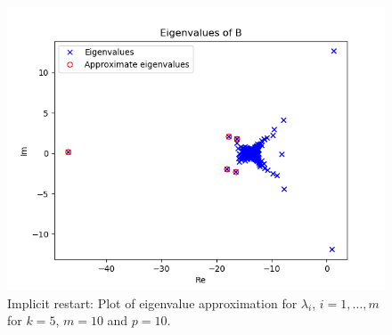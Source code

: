 \begin{figure}[h!]
\centering
\includegraphics[scale=0.8]{../task7/task7b3_k5m10p10.png}
\caption{Implicit restart: Plot of eigenvalue approximation for $\lambda_{i}$, $i = 1,\ldots,m$ for $k = 5$, $m=10$ and $p = 10$.}
\label{fig:task7b2k5}
\end{figure}



